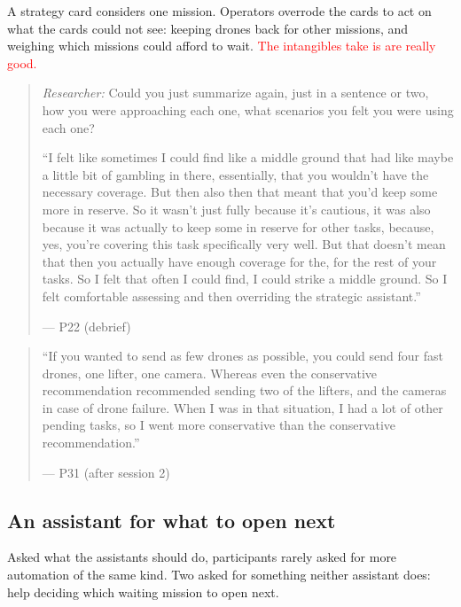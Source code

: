 \label{sec:qual:hierarchy:cross-mission}
A strategy card considers one mission. Operators overrode the cards to act on what the cards could not see: keeping drones back for other missions, and weighing which missions could afford to wait.
\textcolor{red}{The intangibles take is are really good.}
\begin{quote}\small
{\footnotesize\textit{Researcher:} Could you just summarize again, just in a sentence or two, how you were approaching each one, what scenarios you felt you were using each one?}\par\smallskip
``I felt like sometimes I could find like a middle ground that had like maybe a little bit of gambling in there, essentially, that you wouldn't have the necessary coverage. But then also then that meant that you'd keep some more in reserve. So it wasn't just fully because it's cautious, it was also because it was actually to keep some in reserve for other tasks, because, yes, you're covering this task specifically very well. But that doesn't mean that then you actually have enough coverage for the, for the rest of your tasks. So I felt that often I could find, I could strike a middle ground. So I felt comfortable assessing and then overriding the strategic assistant.''\par\hfill--- P22 (debrief)
\end{quote}

\begin{quote}\small
``If you wanted to send as few drones as possible, you could send four fast drones, one lifter, one camera. Whereas even the conservative recommendation recommended sending two of the lifters, and the cameras in case of drone failure. When I was in that situation, I had a lot of other pending tasks, so I went more conservative than the conservative recommendation.''\par\hfill--- P31 (after session 2)
\end{quote}

\clearpage



\subsection{An assistant for what to open next}\label{sec:qual:new-jobs}

Asked what the assistants should do, participants rarely asked for more automation of the same kind. Two asked for something neither assistant does: help deciding which waiting mission to open next.


